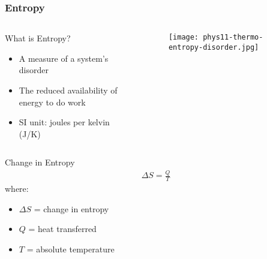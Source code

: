\documentclass{beamer}
\begin{document}
\begin{frame}
    \frametitle{Entropy}
    \begin{columns}
        \begin{block}{What is Entropy?}
            \begin{itemize}
                \item A measure of a system's disorder
                \item The reduced availability of energy to do work
                \item SI unit: joules per kelvin (J/K)
            \end{itemize}
        \end{block}
        
        \begin{center}
            \begin{figure}
                \centering
                \texttt{[image: phys11-thermo-entropy-disorder.jpg]}
            \end{figure}
        \end{center}
    \end{columns}
    
    \begin{exampleblock}{Change in Entropy}
        \begin{align*}
            \Delta S = \frac{Q}{T}
        \end{align*}
        where:
        \begin{itemize}
            \item $\Delta S$ = change in entropy
            \item $Q$ = heat transferred
            \item $T$ = absolute temperature
        \end{itemize}
    \end{exampleblock}
\end{frame}
\end{document}

